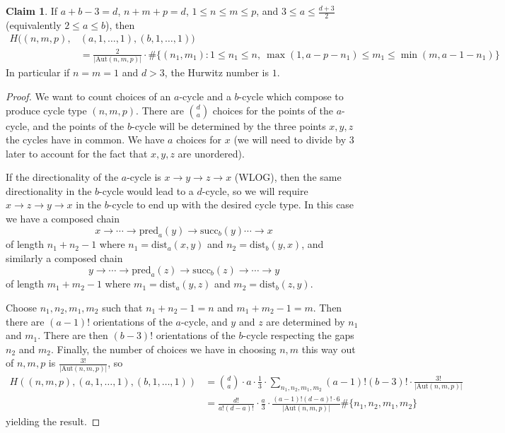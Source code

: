 \documentclass[11pt]{article}           %
\newcommand{\Aut}{\text{Aut}}
\theoremstyle{definition}
\newtheorem{claim}[thm]{Claim}
\begin{document}
\begin{claim}
  If $a+b-3=d$, $n+m+p=d$, $1\leq n\leq m\leq p$, and $3\leq a\leq \frac{d+3}{2}$ (equivalently $2\leq a\leq b$), then
\begin{align*}
  H((n,m,p),&(a,1,\dots,1),(b,1,\dots,1))\\
  &=\frac 2{|\Aut(n,m,p)|}\cdot \#\{(n_1,m_1):1\leq n_1\leq n,\ \max(1,a-p-n_1)\leq m_1\leq \min(m,a-1-n_1)\}
\end{align*}
In particular if $n=m=1$ and $d>3$, the Hurwitz number is $1$.
\end{claim}
\begin{proof}
  We want to count choices of an $a$-cycle and a $b$-cycle which compose to produce cycle type $(n,m,p)$.
  There are $\binom da$ choices for the points of the $a$-cycle, and the
  points of the $b$-cycle will be determined by the three points $x,y,z$ the cycles have in common. We have $a$ choices for
  $x$ (we will need to divide by $3$ later to account for the fact that $x,y,z$ are unordered).

  If the directionality of the $a$-cycle is $x\to y\to z\to x$ (WLOG), then the same directionality in the $b$-cycle would lead to
  a $d$-cycle, so we will require $x\to z\to y\to x$ in the $b$-cycle to end up with the desired cycle type. In this case
  we have a composed chain \[x\to\cdots\to \text{pred}_a(y)\to\text{succ}_b(y)\cdots\to x\] of length $n_1+n_2-1$ where $n_1=\text{dist}_a(x,y)$ and $n_2=\text{dist}_b(y,x)$, and similarly a composed chain
  \[
  y\to\cdots\to\text{pred}_a(z)\to\text{succ}_b(z)\to\cdots\to y
  \]
  of length $m_1+m_2-1$ where $m_1=\text{dist}_a(y,z)$ and $m_2=\text{dist}_b(z,y)$.

  Choose $n_1,n_2,m_1,m_2$ such that $n_1+n_2-1=n$ and $m_1+m_2-1=m$. Then there are $(a-1)!$ orientations of the $a$-cycle, and $y$ and $z$ are determined by $n_1$ and $m_1$. There are then $(b-3)!$ orientations of the $b$-cycle respecting the gaps $n_2$ and $m_2$. Finally, the number of choices we have in choosing $n,m$ this way out of $n,m,p$ is $\frac{3!}{|\Aut(n,m,p)|}$, so
  \begin{align*}
    H((n,m,p),(a,1,\dots,1),(b,1,\dots,1))&=\binom da\cdot a\cdot\frac 13\cdot\sum_{n_1,n_2,m_1,m_2}(a-1)!(b-3)!\cdot\frac{3!}{|\Aut(n,m,p)|} \\
    &=\frac{d!}{a!(d-a)!}\cdot\frac a3\cdot\frac{(a-1)!(d-a)!\cdot 6}{|\Aut(n,m,p)|}\#\{n_1,n_2,m_1,m_2\}
  \end{align*}
  yielding the result.
  
\end{proof}
\end{document}
